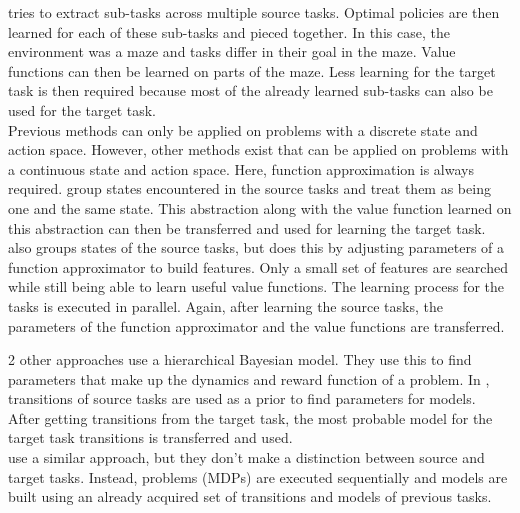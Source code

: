 \documentclass[a4paper]{article}
\begin{document}
\cite{journals/ml/FosterD02} tries to extract sub-tasks across multiple source tasks. Optimal policies are then learned for each of these sub-tasks and pieced together. In this case, the environment was a maze and tasks differ in their goal in the maze. Value functions can then be learned on parts of the maze. Less learning for the target task is then required because most of the already learned sub-tasks can also be used for the target task.\\

Previous methods can only be applied on problems with a discrete state and action space. However, other methods exist that can be applied on problems with a continuous state and action space. Here, function approximation is always required. \cite{walsh2006transferring} group states encountered in the source tasks and treat them as being one and the same state. This abstraction along with the value function learned on this abstraction can then be transferred and used for learning the target task.\\
\cite{lazaric2008knowledge} also groups states of the source tasks, but does this by adjusting parameters of a function approximator to build features. Only a small set of features are searched while still being able to learn useful value functions. The learning process for the tasks is executed in parallel. Again, after learning the source tasks, the parameters of the function approximator and the value functions are transferred.

2 other approaches use a hierarchical Bayesian model. They use this to find parameters that make up the dynamics and reward function of a problem. In \cite{sunmola2006model}, transitions of source tasks are used as a prior to find parameters for models. After getting transitions from the target task, the most probable model for the target task transitions is transferred and used.\\
\cite{conf/icml/WilsonFRT07} use a similar approach, but they don't make a distinction between source and target tasks. Instead, problems (MDPs) are executed sequentially and models are built using an already acquired set of transitions and models of previous tasks.

\cite{DBLP:journals/corr/ParisottoBS15}

\cite{conf/icml/Bou-AmmarERT14}

\cite{Jaderberg2016Reinforcement}

\end{document}
